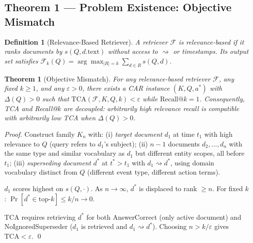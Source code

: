 \documentclass[11pt]{article}
\newtheorem{theorem}{Theorem}
\newtheorem{definition}{Definition}
\begin{document}
\subsection{Theorem 1 — Problem Existence: Objective Mismatch}

\begin{definition}[Relevance-Based Retriever]
A retriever $\mathcal{F}$ is \emph{relevance-based} if it ranks documents by $s(Q, d.\text{text})$ without access to $\rightsquigarrow$ or timestamps. Its output set satisfies $\mathcal{F}_k(Q) = \arg\max_{|R|=k}\sum_{d\in R} s(Q,d)$.
\end{definition}

\begin{theorem}[Objective Mismatch]
\label{thm:insufficiency}
For any relevance-based retriever $\mathcal{F}$, any fixed $k \geq 1$, and any $\varepsilon > 0$, there exists a CAR instance $(K, Q, a^*)$ with $\Delta(Q) > 0$ such that $\mathrm{TCA}(\mathcal{F}, K, Q, k) < \varepsilon$ while $\mathrm{Recall}@k = 1$. Consequently, TCA and Recall@$k$ are decoupled: arbitrarily high relevance recall is compatible with arbitrarily low TCA when $\Delta(Q) > 0$.
\end{theorem}

\begin{proof}
Construct family $K_n$ with:
(i) \emph{target document} $d_1$ at time $t_1$ with high relevance to $Q$ (query refers to $d_1$'s subject);
(ii) $n-1$ documents $d_2, \ldots, d_n$ with the same type and similar vocabulary as $d_1$ but different entity scopes, all before $t_1$;
(iii) \emph{superseding document} $d^*$ at $t^* > t_1$ with $d_1 \rightsquigarrow d^*$, using domain vocabulary distinct from $Q$ (different event type, different action terms).

$d_1$ scores highest on $s(Q, \cdot)$. As $n \to \infty$, $d^*$ is displaced to rank $\geq n$. For fixed $k$: $\Pr[d^* \in \text{top-}k] \leq k/n \to 0$.

TCA requires retrieving $d^*$ for both AnswerCorrect (only active document) and NoIgnoredSuperseder ($d_1$ is retrieved and $d_1 \rightsquigarrow d^*$). Choosing $n > k/\varepsilon$ gives $\text{TCA} < \varepsilon$. \qed
\end{proof}
\end{document}
